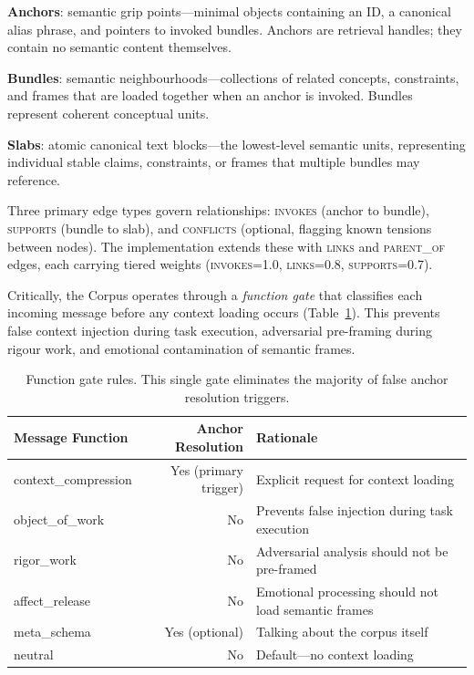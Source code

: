 \documentclass[11pt,a4paper]{article}
\begin{document}
\textbf{Anchors}: semantic grip points---minimal objects containing an ID, a canonical alias phrase, and pointers to invoked bundles.
Anchors are retrieval handles; they contain no semantic content themselves.

\textbf{Bundles}: semantic neighbourhoods---collections of related concepts, constraints, and frames that are loaded together when an anchor is invoked.
Bundles represent coherent conceptual units.

\textbf{Slabs}: atomic canonical text blocks---the lowest-level semantic units, representing individual stable claims, constraints, or frames that multiple bundles may reference.

Three primary edge types govern relationships: \textsc{invokes} (anchor to bundle), \textsc{supports} (bundle to slab), and \textsc{conflicts} (optional, flagging known tensions between nodes).
The implementation extends these with \textsc{links} and \textsc{parent\_of} edges, each carrying tiered weights (\textsc{invokes}=1.0, \textsc{links}=0.8, \textsc{supports}=0.7).

Critically, the Corpus operates through a \emph{function gate} that classifies each incoming message before any context loading occurs (Table~\ref{tab:gate}).
This prevents false context injection during task execution, adversarial pre-framing during rigour work, and emotional contamination of semantic frames.

\begin{table}[t]
\centering
\caption{Function gate rules. This single gate eliminates the majority of false anchor resolution triggers.}
\label{tab:gate}
\small
\begin{tabularx}{\textwidth}{lrX}
\toprule
\textbf{Message Function} & \textbf{Anchor Resolution} & \textbf{Rationale} \\
\midrule
context\_compression & Yes (primary trigger) & Explicit request for context loading \\
object\_of\_work & No & Prevents false injection during task execution \\
rigor\_work & No & Adversarial analysis should not be pre-framed \\
affect\_release & No & Emotional processing should not load semantic frames \\
meta\_schema & Yes (optional) & Talking about the corpus itself \\
neutral & No & Default---no context loading \\
\bottomrule
\end{tabularx}
\end{table}
\end{document}
